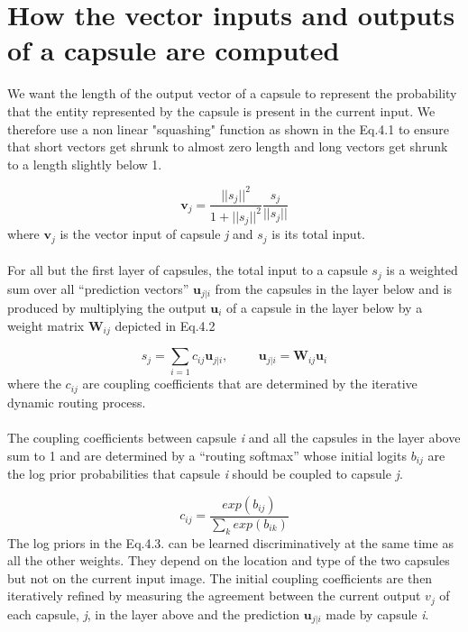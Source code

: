 \documentclass[a4paper,12pt]{report}
\begin{document}
\section{How the vector inputs and outputs of a capsule are computed}
We want the length of the output vector of a capsule to represent the probability that the entity represented by the capsule is present in the current input. We therefore use a non linear "squashing" function as shown in the Eq.4.1 to ensure that short vectors get shrunk to almost zero length and long vectors get shrunk to a length slightly below 1.

\begin{equation}
 \textbf{v}_j = \frac{|| s_j ||^2}{1 + || s_j||^2} \frac{s_j}{|| s_j ||}
\end{equation}
 where $\textbf{v}_{j}$ is the vector input of capsule \textit{j} and $s_j$ is its total input.

\paragraph{}
For all but the first layer of capsules, the total input to a capsule $s_j$  is a weighted sum over all “prediction vectors” $\textbf{u}_{j|i}$ from the capsules in the layer below and is produced by multiplying the output $\textbf{u}_{i}$ of a capsule in the layer below by a weight matrix $\textbf{W}_{ij}$ depicted in Eq.4.2

\begin{equation}
s_j = \sum_{i=1}c_{ij}\mathbf{u}_{j|i} , \hspace{1cm}   \mathbf{u}_{j|i} = \mathbf{W}_{ij}\mathbf{u}_i 
\end{equation}
where the $c_{ij}$ are coupling coefficients that are determined by the iterative dynamic routing process.

\paragraph{}
The coupling coefficients between capsule \textit{i} and all the capsules in the layer above sum to 1 and are determined by a “routing softmax” whose initial logits \textit{$b_{ij}$} are the log prior probabilities that capsule \textit{i} should be coupled to capsule \textit{j}. 

\begin{equation}
c_{ij} = \frac{exp(b_{ij})}{\sum_{k}exp(b_{ik})} 
\end{equation}
The log priors in the Eq.4.3. can be learned discriminatively at the same time as all the other weights. They depend on the location and type of the two capsules but not on the current input image. The initial coupling coefficients are then iteratively refined by measuring the agreement between the current output $v_j$ of
each capsule, \textit{j}, in the layer above and the prediction $\textbf{u}_{j|i}$ made by capsule \textit{i}.
\end{document}
